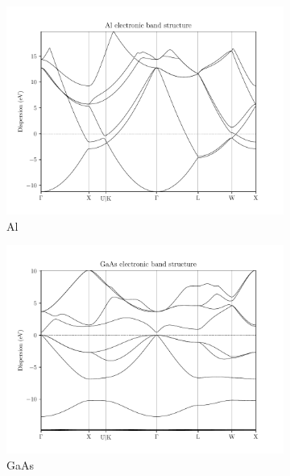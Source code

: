 \begin{figure}
\begin{subfigure}{.5\textwidth}
  \centering
  \includegraphics[width=.9\linewidth]{sections/images/bandstructures/Al_bands.pdf}
  \caption{Al}
  \label{fig:workchain_band_structures_Al}
\end{subfigure}%
\begin{subfigure}{.5\textwidth}
  \centering
  \includegraphics[width=.9\linewidth]{sections/images/bandstructures/GaAs_bands.pdf}
  \caption{GaAs}
  \label{fig:workchain_band_structures_GaAs}
\end{subfigure}%
\newline
\begin{subfigure}{.5\textwidth}
  \centering

\end{subfigure}
\end{figure}
